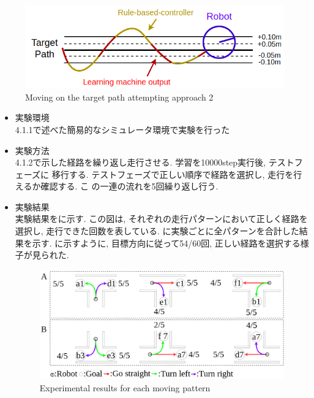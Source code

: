 \begin{figure}[hbtp]
  \centering
 \includegraphics[keepaspectratio, scale=0.58]
      {images/act1.5.png}
 \caption{Moving on the target path attempting approach 2}
 \label{Fig:act1.5}
\end{figure}

\begin{itemize}
  \item 実験環境\\
  4.1.1で述べた簡易的なシミュレータ環境で実験を行った
  \item 実験方法\\
  4.1.2で示した経路を繰り返し走行させる. 学習を10000step実行後, テストフェーズに
  移行する. テストフェーズで正しい順序で経路を選択し, 走行を行えるか確認する. こ
  の一連の流れを5回繰り返し行う.
  \item 実験結果\\
  実験結果をに示す. この図は, それぞれの走行パターンにおいて正しく経路を選択し, 走行できた回数を表している. に実験ごとに全パターンを合計した結果を示す. 
  に示すように, 目標方向に従って54/60回, 正しい経路を選択する様子が見られた. 

  
  \begin{figure}[hbtp]
    \centering
   \includegraphics[keepaspectratio, scale=0.27]
        {images/10000step_act1.5.png}
   \caption{Experimental results for each moving pattern}
   \label{Fig:10000step_act1.5}
  \end{figure}  
  

\end{itemize}
